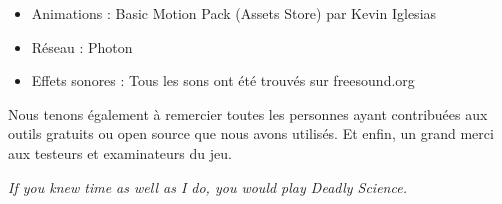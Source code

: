 \documentclass{article}
\begin{document}
\begin{itemize}
    \item Animations : Basic Motion Pack (Assets Store) par Kevin Iglesias
    \item Réseau : Photon
    \item Effets sonores : Tous les sons ont été trouvés sur freesound.org
\end{itemize}
    
Nous tenons également à remercier toutes les personnes ayant contribuées aux outils gratuits ou open source que nous avons utilisés.
Et enfin, un grand merci aux testeurs et examinateurs du jeu.


\newpage
\begin{center}
\emph{If you knew time as well as I do, you would play Deadly Science.}
\end{center}
\end{document}
